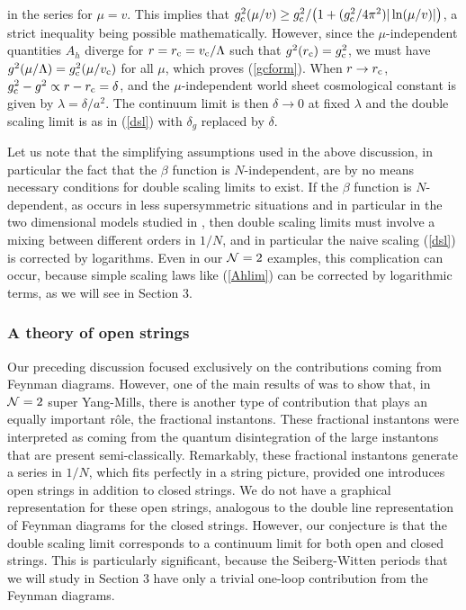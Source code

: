 \documentclass[a4paper,12pt]{article}
\def\rc{r_{\rm c}}\def\gc{g_{\rm c}}
\begin{document}
{%
in the series for $\mu=v$. This implies that 
$\gc^2(\mu /v) \geq \gc^2 /\bigl(1+ (\gc^2/4\pi^2) |\ln(\mu /v)|\bigr)$, a
strict inequality being possible mathematically. However, since the 
$\mu$-independent quantities
$A_{h}$ diverge for $r=\rc=v_{\rm c}/\Lambda$ such that 
$g^{2}(\rc) = \gc^{2}$, we must have $g^{2}(\mu /\Lambda) = \gc^{2}(\mu 
/v_{\rm c})$ for all $\mu$, which proves (\ref{gcform}). 
When $r\rightarrow\rc$, $\gc^{2}-g^{2}\propto r-\rc = \delta$, and the 
$\mu$-independent world sheet cosmological constant is given by
$\lambda = \delta /a^{2}$.
The continuum limit is then $\delta\rightarrow 0$ at fixed $\lambda$ and
the double scaling limit is as in (\ref{dsl}) with $\delta_{g}$ replaced 
by $\delta$.

Let us note that the simplifying assumptions used in the above discussion, in 
particular the fact that the $\beta$ function is $N$-independent, are by no 
means necessary conditions for double scaling limits to exist. If the 
$\beta$ function is $N$-dependent, as occurs in less supersymmetric 
situations and in particular in the two dimensional models studied in 
\cite{fer2}, then double scaling limits must involve a mixing between 
different orders in $1/N$, and in particular the naive scaling (\ref{dsl}) 
is corrected by logarithms. Even in our ${\cal N}=2$ examples, this 
complication can occur, because simple scaling laws like (\ref{Ahlim}) 
can be corrected by logarithmic terms, as we will see in Section 3.
%
\subsubsection{A theory of open strings}
%
Our preceding discussion focused exclusively on the contributions coming from 
Feynman diagrams. However, one of the main results
of \cite{fer} was to show that, 
in ${\cal N}=2$ super Yang-Mills, there is another type of contribution 
that plays an equally important r\^ole, the fractional instantons. These 
fractional instantons were interpreted as coming from the quantum
disintegration of the large instantons that are present semi-classically.
Remarkably, these fractional instantons generate a series in $1/N$, which 
fits perfectly in a string picture, provided one introduces open strings in 
addition to closed strings. We do not have a graphical representation for 
these open strings, analogous to the double line representation of
Feynman diagrams for the closed strings. However, our conjecture is that 
the double scaling limit corresponds to a continuum limit for both open and 
closed strings. This is particularly significant, because the 
Seiberg-Witten periods that we will study in Section 3
have only a trivial one-loop contribution from the Feynman diagrams.

}
\end{document}
